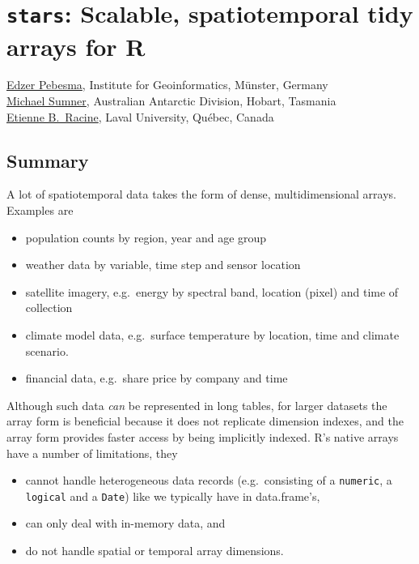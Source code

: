 \section*{{\tt stars}: Scalable, spatiotemporal tidy arrays for
R}\label{scalable-spatiotemporal-tidy-arrays-for-r}

\noindent
\href{https://github.com/edzer/}{Edzer Pebesma}, Institute for Geoinformatics, M\"{u}nster, Germany\\
\href{https://github.com/mdsumer/}{Michael Sumner}, Australian Antarctic Division, Hobart, Tasmania \\
\href{https://github.com/etiennebr}{Etienne B.~Racine}, Laval University, Qu\'{e}bec, Canada

\subsection*{Summary}\label{summary}

A lot of spatiotemporal data takes the form of dense, multidimensional
arrays. Examples are

\begin{itemize}
\tightlist
\item
  population counts by region, year and age group
\item
  weather data by variable, time step and sensor location
\item
  satellite imagery, e.g.~energy by spectral band, location (pixel) and
  time of collection
\item
  climate model data, e.g.~surface temperature by location, time and
  climate scenario.
\item
  financial data, e.g.~share price by company and time
\end{itemize}

Although such data \emph{can} be represented in long tables, for larger
datasets the array form is beneficial because it does not replicate
dimension indexes, and the array form provides faster access by being
implicitly indexed. R's native arrays have a number of limitations, they

\begin{itemize}
\tightlist
\item
  cannot handle heterogeneous data records (e.g.~consisting of a
  \texttt{numeric}, a \texttt{logical} and a \texttt{Date}) like we
  typically have in data.frame's,
\item
  can only deal with in-memory data, and
\item
  do not handle spatial or temporal array dimensions.
\end{itemize}

